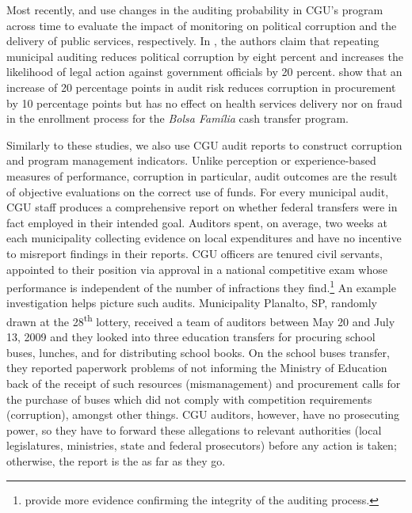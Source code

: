 \documentclass[11pt]{article}
\begin{document}
Most recently, \citet{AvisGovernmentAuditsReduce2018} and \citet{ZamboniAuditRiskRent2018} use changes in the auditing probability in CGU's program across time to evaluate the impact of monitoring on political corruption and the delivery of public services, respectively. In \citet{AvisGovernmentAuditsReduce2018}, the authors claim that repeating municipal auditing reduces political corruption by eight percent and increases the likelihood of legal action against government officials by 20 percent. \citet{ZamboniAuditRiskRent2018} show that an increase of 20 percentage points in audit risk reduces corruption in procurement by 10 percentage points but has no effect on health services delivery nor on fraud in the enrollment process for the \emph{Bolsa Família} cash transfer program.

Similarly to these studies, we also use CGU audit reports to construct corruption and program management indicators. Unlike perception or experience-based measures of performance, corruption in particular, audit outcomes are the result of objective evaluations on the correct use of funds. For every municipal audit, CGU staff produces a comprehensive report on whether federal transfers were in fact employed in their intended goal. Auditors spent, on average, two weeks at each municipality collecting evidence on local expenditures and have no incentive to misreport findings in their reports. CGU officers are tenured civil servants, appointed to their position via approval in a national competitive exam whose performance is independent of the number of infractions they find.\footnote{\citet{FerrazExposingCorruptPoliticians2008b,FerrazElectoralAccountabilityCorruption2011a,ZamboniAuditRiskRent2018} provide more evidence confirming the integrity of the auditing process.} An example investigation helps picture such audits. Municipality Planalto, SP, randomly drawn at the 28\textsuperscript{th} lottery, received a team of auditors between May 20 and July 13, 2009 and they looked into three education transfers for procuring school buses, lunches, and for distributing school books. On the school buses transfer, they reported paperwork problems of not informing the Ministry of Education back of the receipt of such resources (mismanagement) and procurement calls for the purchase of buses which did not comply with competition requirements (corruption), amongst other things. CGU auditors, however, have no prosecuting power, so they have to forward these allegations to relevant authorities (local legislatures, ministries, state and federal prosecutors) before any action is taken; otherwise, the report is the as far as they go.
\end{document}
